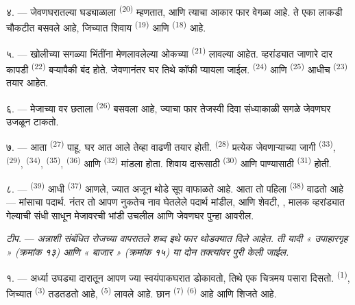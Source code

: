 ४. --- जेवणघरातल्या घड्याळाला  \textsuperscript{(20)} म्हणतात, आणि
त्याचा आकार फार वेगळा आहे. ते एका लाकडी चौकटीत बसवले आहे, जिच्यात शिवाय 
\textsuperscript{(19)} आणि  \textsuperscript{(18)} आहे.

\VUsaut{4.6mm}
\VUsaut{3.0mm}

५. --- खोलीच्या सगळ्या भिंतींना मेणलावलेल्या ओकच्या 
\textsuperscript{(21)} लावल्या आहेत. व्हरांड्यात जाणारे दार कापडी 
\textsuperscript{(22)} बऱ्यापैकी बंद होते. जेवणानंतर घर तिथे कॉफी प्यायला जाईल. 
\textsuperscript{(24)} आणि  \textsuperscript{(25)} आधीच 
\textsuperscript{(23)} तयार आहेत.

६. --- मेजाच्या वर छताला  \textsuperscript{(26)} बसवला आहे, ज्याचा फार
तेजस्वी दिवा संध्याकाळी सगळे जेवणघर उजळून टाकतो.

७. --- आता  \textsuperscript{(27)} पाहू. घर आत आले तेव्हा वाढणी तयार
होती.  \textsuperscript{(28)} प्रत्येक जेवणाऱ्याच्या जागी 
\textsuperscript{(33)},  \textsuperscript{(29)}, 
\textsuperscript{(34)},  \textsuperscript{(35)}, 
\textsuperscript{(36)} आणि  \textsuperscript{(32)} मांडला होता. शिवाय दारूसाठी
 \textsuperscript{(30)} आणि पाण्यासाठी  \textsuperscript{(31)}
होती.

८. ---  \textsuperscript{(39)} आधी  \textsuperscript{(37)}
आणले, ज्यात अजून थोडे सूप वाफाळते आहे. आता तो पहिला  \textsuperscript{(38)}
वाढतो आहे — मांसाचा पदार्थ. नंतर तो आपण नुकतेच नाव घेतलेले पदार्थ मांडील, आणि शेवटी,
, मालक व्हरांड्यात गेल्याची संधी साधून मेजावरची भांडी उचलील आणि जेवणघर
पुन्हा आवरील.

\textit{टीप.} ---
\textit{अन्नाशी संबंधित रोजच्या वापरातले शब्द इथे फार थोडक्यात दिले आहेत. ती यादी « उपाहारगृह » (क्रमांक १३) आणि « बाजार » (क्रमांक १५) या दोन तक्त्यांवर पुरी केली जाईल.}

\VUsaut{4.6mm}
\VUsaut{3.0mm}

१. --- अर्ध्या उघड्या दारातून आपण ज्या स्वयंपाकघरात डोकावतो, तिथे एक चित्रमय पसारा दिसतो.
 \textsuperscript{(1)}, जिच्यात  \textsuperscript{(3)} तडतडतो
आहे,  \textsuperscript{(5)} लावले आहे. छान 
\textsuperscript{(7)}  \textsuperscript{(6)} आहे आणि शिजते आहे.


